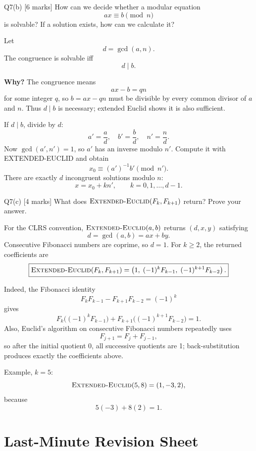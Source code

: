 \documentclass[10.5pt,a4paper]{article}
\begin{document}
\begin{questionbox}{Q7(b) [6 marks]}
How can we decide whether a modular equation
\[
ax\equiv b\pmod n
\]
is solvable? If a solution exists, how can we calculate it?
\end{questionbox}

\begin{answerbox}
Let
\[
d=\gcd(a,n).
\]
The congruence is solvable iff
\[
\boxed{d\mid b}.
\]

\textbf{Why?} The congruence means
\[
ax-b=qn
\]
for some integer \(q\), so \(b=ax-qn\) must be divisible by every common divisor of \(a\) and \(n\). Thus \(d\mid b\) is necessary; extended Euclid shows it is also sufficient.

If \(d\mid b\), divide by \(d\):
\[
a'=\frac ad,\quad b'=\frac bd,\quad n'=\frac nd.
\]
Now \(\gcd(a',n')=1\), so \(a'\) has an inverse modulo \(n'\). Compute it with EXTENDED-EUCLID and obtain
\[
x_0\equiv (a')^{-1}b'\pmod{n'}.
\]
There are exactly \(d\) incongruent solutions modulo \(n\):
\[
\boxed{x=x_0+k n',\qquad k=0,1,\ldots,d-1.}
\]
\end{answerbox}

\begin{questionbox}{Q7(c) [4 marks]}
What does \(\textsc{Extended-Euclid}(F_k,F_{k+1})\) return? Prove your answer.
\end{questionbox}

\begin{answerbox}
For the CLRS convention, \(\textsc{Extended-Euclid}(a,b)\) returns \((d,x,y)\) satisfying
\[
d=\gcd(a,b)=ax+by.
\]
Consecutive Fibonacci numbers are coprime, so \(d=1\). For \(k\ge2\), the returned coefficients are
\[
\boxed{
\textsc{Extended-Euclid}(F_k,F_{k+1})
=
\left(1,\;(-1)^kF_{k-1},\;(-1)^{k+1}F_{k-2}\right).
}
\]

Indeed, the Fibonacci identity
\[
F_kF_{k-1}-F_{k+1}F_{k-2}=(-1)^k
\]
gives
\[
F_k\bigl((-1)^kF_{k-1}\bigr)
+F_{k+1}\bigl((-1)^{k+1}F_{k-2}\bigr)=1.
\]
Also, Euclid's algorithm on consecutive Fibonacci numbers repeatedly uses
\[
F_{j+1}=F_j+F_{j-1},
\]
so after the initial quotient 0, all successive quotients are 1; back-substitution produces exactly the coefficients above.

Example, \(k=5\):
\[
\textsc{Extended-Euclid}(5,8)=(1,-3,2),
\]
because
\[
5(-3)+8(2)=1.
\]
\end{answerbox}

\newpage
\section*{Last-Minute Revision Sheet}
\end{document}

